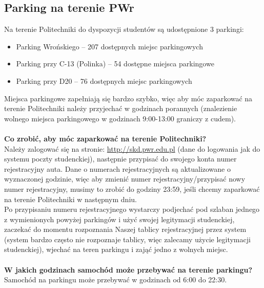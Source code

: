 \documentclass[11pt]{article}
\begin{document}
\subsection{Parking na terenie PWr}
\indent \hspace{0.5cm} Na terenie Politechniki do dyspozycji studentów są udostępnione 3 parkingi:
\begin{itemize}
    \item Parking Wrońskiego – 207 dostępnych miejsc parkingowych
    \item Parking przy C-13 (Polinka) – 54 dostępne miejsca parkingowe
    \item Parking przy D20 – 76 dostępnych miejsc parkingowych
\end{itemize}
\indent \hspace{0.5cm} Miejsca parkingowe zapełniają się bardzo szybko, więc aby móc zaparkować na terenie Politechniki należy przyjechać w godzinach porannych (znalezienie wolnego miejsca parkingowego w godzinach 9:00-13:00 graniczy z cudem).\\\\
\textbf{Co zrobić, aby móc zaparkować na terenie Politechniki?}\\
\indent Należy zalogować się na stronie: {\color{blue}\url{http://skd.pwr.edu.pl}} (dane do logowania 
jak do systemu poczty studenckiej), następnie przypisać do swojego konta numer rejestracyjny auta. \linebreak Dane o numerach rejestracyjnych są aktualizowane o wyznaczonej godzinie, więc aby zmienić numer rejestracyjny/przypisać nowy numer rejestracyjny, musimy to zrobić do godziny 23:59, jeśli chcemy zaparkować na terenie Politechniki w następnym dniu.\\
\indent Po przypisaniu numeru rejestracyjnego wystarczy podjechać pod szlaban jednego z wymienionych powyżej parkingów i użyć swojej legitymacji studenckiej, zaczekać do momentu rozpoznania Naszej tablicy rejestracyjnej przez system (system bardzo często nie rozpoznaje tablicy, więc zalecamy użycie legitymacji studenckiej), wjechać na teren parkingu i zająć jedno z wolnych miejsc.\\\\
\textbf{W jakich godzinach samochód może przebywać na terenie parkingu?}\\
\indent Samochód na parkingu może przebywać w godzinach od 6:00 do 22:30.\\\\
\end{document}
